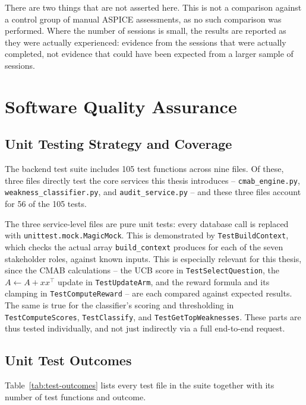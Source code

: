 \documentclass[a4paper, 12pt, oneside, openany, BCOR1cm,toc=chapterentrywithdots]{scrbook}
\begin{document}
There are two things that are not asserted here. This is not a comparison against a control
group of manual ASPICE assessments, as no such comparison was performed. Where the number of
sessions is small, the results are reported as they were actually experienced: evidence from the
sessions that were actually completed, not evidence that could have been expected from a larger
sample of sessions.

\section{Software Quality Assurance}
\subsection{Unit Testing Strategy and Coverage}

The backend test suite includes 105 test functions across nine files. Of these, three files
directly test the core services this thesis introduces -- \texttt{cmab\_engine.py},
\texttt{weakness\_classifier.py}, and \texttt{audit\_service.py} -- and these three files
account for 56 of the 105 tests.

The three service-level files are pure unit tests: every database call is replaced with
\texttt{unittest.mock.MagicMock}. This is demonstrated by
\texttt{TestBuildContext}, which checks the actual array
\texttt{build\_context} produces for each of the seven stakeholder roles, against known inputs.
This is especially relevant for this thesis, since the CMAB calculations -- the UCB score in
\texttt{TestSelectQuestion}, the $A \leftarrow A + xx^\top$ update in \texttt{TestUpdateArm}, and
the reward formula and its clamping in \texttt{TestComputeReward} -- are each compared against
expected results. The same is true for the classifier's scoring and thresholding in
\texttt{TestComputeScores}, \texttt{TestClassify}, and \texttt{TestGetTopWeaknesses}. These
parts are thus tested individually, and not just indirectly via a full end-to-end request.

\subsection{Unit Test Outcomes}

Table~\ref{tab:test-outcomes} lists every test file in the suite together with its number of
test functions and outcome.
\end{document}
